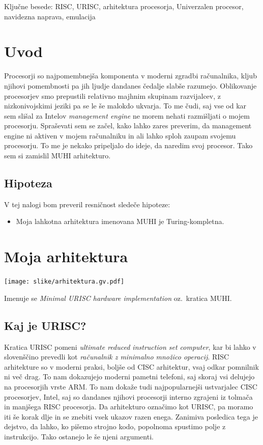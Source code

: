 \documentclass[12pt]{article}
\begin{document}
Ključne besede: RISC, URISC, arhitektura procesorja, Univerzalen procesor, navidezna naprava, emulacija

\pagebreak


\section{Uvod}
Procesorji so najpomembnejša komponenta v moderni zgradbi računalnika, kljub njihovi pomembnosti pa jih ljudje dandanes čedalje slabše razumejo.
Oblikovanje procesorjev smo prepustili relativno majhnim skupinam razvijalcev, z nizkonivojskimi jeziki pa se le še malokdo ukvarja.
To me čudi, saj vse od kar sem slišal za Intelov \textit{management engine} ne morem nehati razmišljati o mojem procesorju.
Spraševati sem se začel, kako lahko zares preverim, da management engine ni aktiven v mojem računalniku in ali lahko sploh zaupam svojemu procesorju.
To me je nekako pripeljalo do ideje, da naredim svoj procesor.
Tako sem si zamislil MUHI arhitekturo.

\subsection{Hipoteza}
V tej nalogi bom preveril resničnost sledeče hipoteze:
\begin{itemize}
  \item Moja lahkotna arhitektura imenovana MUHI je Turing-kompletna.
\end{itemize}

\section{Moja arhitektura}
\begin{center}
  \texttt{[image: slike/arhitektura.gv.pdf]}
\end{center}
Imenuje se \textit{Minimal URISC hardware implementation} oz.\ kratica MUHI.\@
\subsection{Kaj je URISC?}
Kratica URISC pomeni \textit{ultimate reduced instruction set computer}, kar bi lahko v slovenščino prevedli kot \textit{računalnik z minimalno množico operacij}.
RISC arhitekture so v moderni praksi, boljše od CISC arhitektur, vsaj odkar pomnilnik ni več drag.
To nam dokazujejo moderni pametni telefoni, saj skoraj vsi delujejo na procesorjih vrste ARM.
To nam dokaže tudi najpopularnejši ustvarjalec CISC procesorjev, Intel, saj so dandanes njihovi procesorji interno zgrajeni iz tolmača in manjšega RISC procesorja.
Da arhitekturo označimo kot URISC, pa moramo iti še korak dlje in se znebiti vsek ukazov razen enega.
Zanimiva posledica tega je dejstvo, da lahko, ko pišemo strojno kodo, popolnoma spustimo polje z instrukcijo.
Tako ostanejo le še njeni argumenti.
\end{document}

